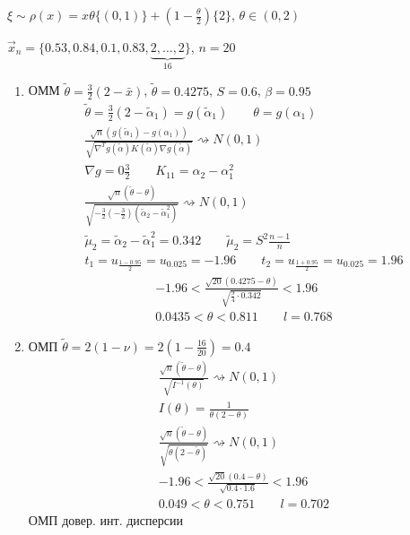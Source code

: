 \documentclass{article}
\begin{document}
\begin{eg}
  $\xi \sim \rho(x)=x\theta\{(0,1)\}+(1-\frac{\theta}{2})\{2\}$, $\theta\in(0,2)$

  $\vec{x}_n=\{0.53, 0.84, 0.1, 0.83, \underbrace{2,\dots ,2}_{16}\}$, $n=20$
  \begin{enumerate}
    \item ОММ $\tilde{\theta}=\frac{3}{2}(2-\bar{x})$, $\tilde{\theta}=0.4275$, $S=0.6$, $\beta=0.95$
      \begin{gather*}
        \tilde{\theta}=\frac{3}{2}(2-\tilde{\alpha}_1)=g(\tilde{\alpha}_1) \qquad \theta=g(\alpha_1) \\ 
        \frac{\sqrt{n}(g(\tilde{\alpha}_1)-g(\alpha_1))}{\sqrt{\nabla ^{T} g(\tilde{\alpha})K(\tilde{\alpha})\nabla g(\tilde{\alpha})}} \rightsquigarrow N(0,1) \\ 
        \nabla g =0\frac{3}{2} \qquad K_{11}=\alpha_2-\alpha_1^{2} \\ 
        \frac{\sqrt{n}(\tilde{\theta}-\theta)}{\sqrt{-\frac{3}{2}(-\frac{3}{2})(\tilde{\alpha}_2-\tilde{\alpha}_1^{2})}} \rightsquigarrow N(0,1) \\ 
        \tilde{\mu}_2=\tilde{\alpha}_2-\tilde{\alpha}_1^{2}=0.342 \qquad \tilde{\mu}_2=S^{2}\frac{n-1}{n} \\ 
      t_1=u_{\frac{1-0.95}{2}}=u_{0.025}=-1.96 \qquad t_2=u_{\frac{1+0.95}{2}}=u_{0.025}=1.96 
      \end{gather*}
      \begin{gather*}
        -1.96 < \frac{\sqrt{20}(0.4275-\theta)}{\sqrt{\frac{9}{4}\cdot 0.342}} < 1.96 \\ 
        0.0435 < \theta < 0.811 \qquad l=0.768
      \end{gather*}
    \item ОМП $\tilde{\theta}=2(1-\nu)=2(1-\frac{16}{20})=0.4$
      \begin{gather*}
        \frac{\sqrt{n}(\tilde{\theta}-\theta)}{\sqrt{I^{-1}(\theta)}} \rightsquigarrow N(0,1) \\ 
        I(\theta)=\frac{1}{\theta(2-\theta)} \\ 
        \frac{\sqrt{n}(\tilde{\theta}-\theta)}{\sqrt{\tilde{\theta}(2-\tilde{\theta})}} \rightsquigarrow N(0,1) \\ 
        -1.96 < \frac{\sqrt{20}(0.4-\theta)}{\sqrt{0.4 \cdot 1.6}} < 1.96 \\ 
        0.049 < \theta < 0.751 \qquad l=0.702
      \end{gather*}
      ОМП довер. инт. дисперсии
      \begin{gather*}

\end{gather*}
\end{enumerate}
\end{eg}
\end{document}
